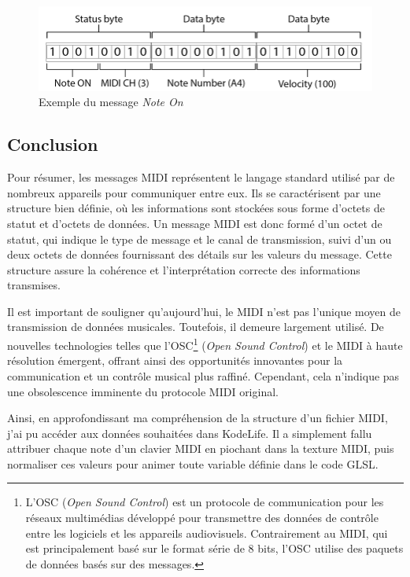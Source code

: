 \begin{figure}[h]
    \centering
    \includegraphics[width=12cm]{images/experiments/midi01.png}
    \caption{Exemple du message \textit{Note On}}
    \label{midi01}
\end{figure}


\subsection*{Conclusion}

Pour résumer, les messages MIDI représentent le langage standard utilisé par de nombreux appareils pour communiquer entre eux. Ils se caractérisent par une structure bien définie, où les informations sont stockées sous forme d'octets de statut et d'octets de données. Un 
message MIDI est donc formé d'un octet de statut, qui indique le type de message et le canal de transmission, suivi d'un ou deux octets de données fournissant des détails sur les valeurs du message. Cette structure assure la cohérence et l'interprétation correcte des informations transmises.

Il est important de souligner qu'aujourd'hui, le MIDI n'est pas l'unique moyen de transmission de données musicales. Toutefois, il demeure largement utilisé. De nouvelles technologies telles que l'OSC\footnote{L'OSC (\textit{Open Sound Control}) est un protocole de communication pour les réseaux multimédias développé pour transmettre des données de contrôle entre les logiciels et les appareils audiovisuels. Contrairement au MIDI, qui est principalement basé sur le format série de 8 bits, l'OSC utilise des paquets de données basés sur des messages.} (\textit{Open Sound Control}) et le MIDI à haute résolution émergent, offrant ainsi des opportunités innovantes pour la communication et un contrôle musical plus raffiné. Cependant, cela n'indique pas une obsolescence imminente du protocole MIDI original.

Ainsi, en approfondissant ma compréhension de la structure d'un fichier MIDI, j'ai pu accéder aux données souhaitées dans KodeLife. Il a simplement fallu attribuer chaque note d'un clavier MIDI en piochant dans la texture MIDI, puis normaliser ces valeurs pour animer toute variable définie dans le code GLSL.



